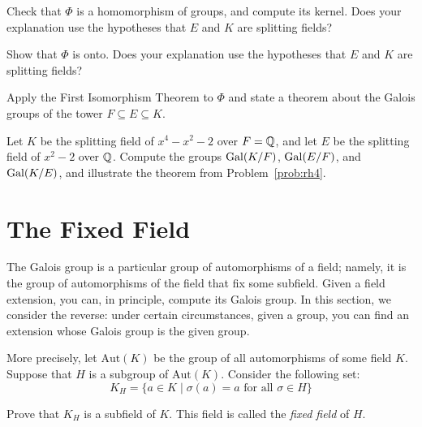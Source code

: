 \begin{problem}
Check that $\Phi$ is a homomorphism of groups, and compute its kernel. Does your explanation use the hypotheses that $E$ and $K$ are splitting fields?
\end{problem}


\begin{problem}
Show that $\Phi$ is onto. Does your explanation use the hypotheses that $E$ and $K$ are splitting fields?
\end{problem}



\begin{problem}\label{prob:rh4}
    Apply the First Isomorphism Theorem to $\Phi$ and state a theorem about the Galois groups of the tower $F\subseteq E \subseteq K$.
\end{problem}



\begin{problem}
    Let $K$ be the splitting field of $x^4-x^2-2$ over $F=\mathbb{Q}$, and let $E$ be the splitting field of $x^2-2$ over $\mathbb{Q}$. Compute the groups $\operatorname{Gal}(K/F)$, $\operatorname{Gal}(E/F)$, and $\operatorname{Gal}(K/E)$, and illustrate the theorem from Problem~\ref{prob:rh4}.
\end{problem}




\section{The Fixed Field}

The Galois group is a particular group of automorphisms of a field; namely, it is the group of automorphisms of the field that fix some subfield.  Given a field extension, you can, in principle, compute its Galois group.  In this section, we consider the reverse: under certain circumstances, given a group, you can find an extension whose Galois group is the given group. \smallskip

More precisely, let $\mbox{Aut}(K)$ be the group of all automorphisms of some field $K$.  Suppose that $H$ is a subgroup of $\mbox{Aut}(K)$.  Consider the following set:
$$K_H = \{a \in K \mid \sigma(a) = a \mbox{ for all } \sigma \in H\}$$

\begin{problem}
 Prove that $K_H$ is a subfield of $K$.  This field is called the \emph{fixed field} of $H$.
\end{problem}



